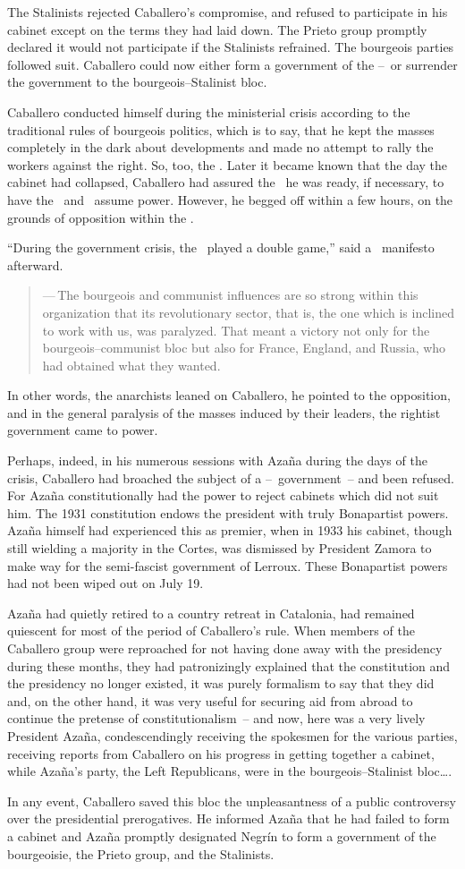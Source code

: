 The Stalinists rejected Caballero’s compromise, and refused to participate in his cabinet except on the terms they had laid down. The Prieto group promptly declared it would not participate if the Stalinists refrained. The bourgeois parties followed suit. Caballero could now either form a government of the \UGT--\CNT\ or surrender the government to the bourgeois--Stalinist bloc.

Caballero conducted himself during the ministerial crisis according to the traditional rules of bourgeois politics, which is to say, that he kept the masses completely in the dark about developments and made no attempt to rally the workers against the right. So, too, the \CNT\kn. Later it became known that the day the cabinet had collapsed, Caballero had assured the \CNT\ he was ready, if necessary, to have the \UGT\ and \CNT\ assume power. However, he begged off within a few hours, on the grounds of opposition within the \UGT\kn.

\medskip

``During the government crisis, the \UGT\ played a double game,'' said a \FAI\ manifesto afterward.

\begin{quotation}
  \noindent
  —\,The bourgeois and communist influences are so strong within this organization that its revolutionary sector, that is, the one which is inclined to work with us, was paralyzed. That meant a victory not only for the bourgeois--communist bloc but also for France, England, and Russia, who had obtained what they wanted.
\end{quotation}

In other words, the anarchists leaned on Caballero, he pointed to the opposition, and in the general paralysis of the masses induced by their leaders, the rightist government came to power.

Perhaps, indeed, in his numerous sessions with Azaña during the days of the crisis, Caballero had broached the subject of a \UGT--\CNT\ government~-- and been refused. For Azaña constitutionally had the power to reject cabinets which did not suit him. The 1931 constitution endows the president with truly Bonapartist powers. Azaña himself had experienced this as premier, when in 1933 his cabinet, though still wielding a majority in the Cortes, was dismissed by President Zamora to make way for the semi-fascist government of Lerroux. These Bonapartist powers had not been wiped out on July 19.

Azaña had quietly retired to a country retreat in Catalonia, had remained quiescent for most of the period of Caballero’s rule. When members of the Caballero group were reproached for not having done away with the presidency during these months, they had patronizingly explained that the constitution and the presidency no longer existed, it was purely formalism to say that they did and, on the other hand, it was very useful for securing aid from abroad to continue the pretense of constitutionalism~-- and now, here was a very lively President Azaña, condescendingly receiving the spokesmen for the various parties, receiving reports from Caballero on his progress in getting together a cabinet, while Azaña’s party, the Left Republicans, were in the bourgeois--Stalinist bloc\dots.

In any event, Caballero saved this bloc the unpleasantness of a public controversy over the presidential prerogatives. He informed Azaña that he had failed to form a cabinet and Azaña promptly designated Negr\'in to form a government of the bourgeoisie, the Prieto group, and the Stalinists.